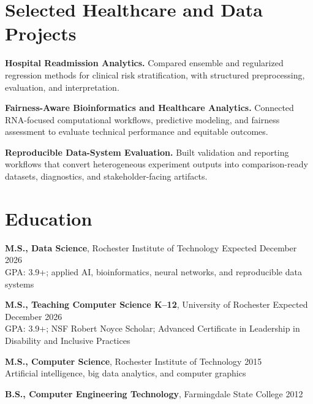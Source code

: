 \documentclass[10pt,letterpaper]{article}
\begin{document}
\section*{Selected Healthcare and Data Projects}
\textbf{Hospital Readmission Analytics.}
Compared ensemble and regularized regression methods for clinical risk
stratification, with structured preprocessing, evaluation, and interpretation.

\textbf{Fairness-Aware Bioinformatics and Healthcare Analytics.}
Connected RNA-focused computational workflows, predictive modeling, and
fairness assessment to evaluate technical performance and equitable outcomes.

\textbf{Reproducible Data-System Evaluation.}
Built validation and reporting workflows that convert heterogeneous experiment
outputs into comparison-ready datasets, diagnostics, and stakeholder-facing
artifacts.

\section*{Education}
\textbf{M.S., Data Science}, Rochester Institute of Technology
\hfill Expected December 2026\\
GPA: 3.9+; applied AI, bioinformatics, neural networks, and reproducible data systems

\textbf{M.S., Teaching Computer Science K--12}, University of Rochester
\hfill Expected December 2026\\
GPA: 3.9+; NSF Robert Noyce Scholar; Advanced Certificate in Leadership in
Disability and Inclusive Practices

\textbf{M.S., Computer Science}, Rochester Institute of Technology
\hfill 2015\\
Artificial intelligence, big data analytics, and computer graphics

\textbf{B.S., Computer Engineering Technology}, Farmingdale State College
\hfill 2012
\end{document}
